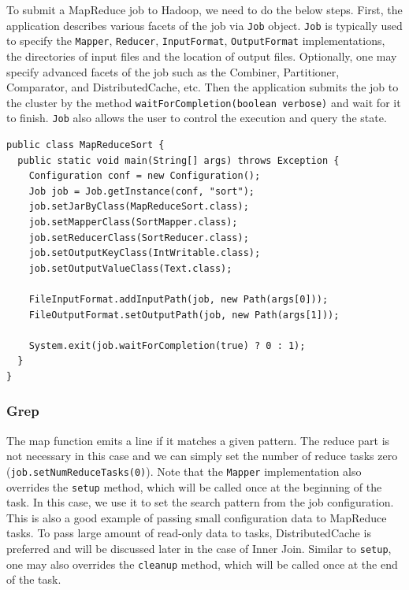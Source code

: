 \documentclass[11pt]{book}
\begin{document}
To submit a MapReduce job to Hadoop, we need to do the below steps. First, the application describes various facets of the job via \texttt{Job} object. \texttt{Job} is typically used to specify the \texttt{Mapper}, \texttt{Reducer}, \texttt{InputFormat}, \texttt{OutputFormat} implementations, the directories of input files and the location of output files.
Optionally, one may specify advanced facets of the job such as the Combiner, Partitioner, Comparator, and DistributedCache, etc. Then the application submits the job to the cluster by the method \texttt{waitForCompletion(boolean verbose)}  and wait for it to finish.
\texttt{Job} also allows the user to control the execution and query the state.
\begin{lstlisting}
public class MapReduceSort {
  public static void main(String[] args) throws Exception {
    Configuration conf = new Configuration();
    Job job = Job.getInstance(conf, "sort");
    job.setJarByClass(MapReduceSort.class);
    job.setMapperClass(SortMapper.class);
    job.setReducerClass(SortReducer.class);
    job.setOutputKeyClass(IntWritable.class);
    job.setOutputValueClass(Text.class);

    FileInputFormat.addInputPath(job, new Path(args[0]));
    FileOutputFormat.setOutputPath(job, new Path(args[1]));

    System.exit(job.waitForCompletion(true) ? 0 : 1);
  }
}
\end{lstlisting}
\subsubsection{Grep}

The map function emits a line if it matches a given pattern. The reduce part is not necessary in this case and we can simply set the number of reduce tasks zero (\texttt{job.setNumReduceTasks(0)}). Note that the \texttt{Mapper} implementation also overrides the \texttt{setup} method, which will be called once at the beginning of the task. In this case, we use it to set the search pattern from the job configuration. This is also a good example of passing small configuration data to MapReduce tasks. To pass large amount of read-only data to tasks, DistributedCache is preferred and will be discussed later in the case of Inner Join. Similar to \texttt{setup}, one may also overrides the \texttt{cleanup} method, which will be called once at the end of the task.
\end{document}
